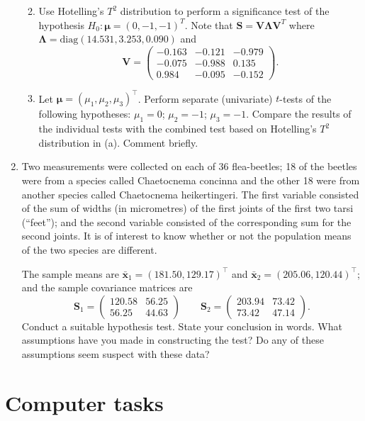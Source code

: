 \documentclass[]{book}
\providecommand{\tightlist}{%
  \setlength{\itemsep}{0pt}\setlength{\parskip}{0pt}}
\theoremstyle{definition}
\theoremstyle{definition}
\theoremstyle{definition}
\theoremstyle{remark}
\begin{document}
\begin{enumerate}
  \begin{enumerate}
  \def\labelenumii{\roman{enumii}.}
  \tightlist
  \item
    Use Hotelling's \(T^2\) distribution to perform a significance test of the hypothesis \(H_0: {\boldsymbol{\mu}}= (0,-1,-1)^T\). Note that \(\mathbf S= \mathbf V\boldsymbol \Lambda\mathbf V^T\) where \(\boldsymbol \Lambda= \text{diag}(14.531, 3.253,0.090)\) and
    \[\mathbf V= \begin{pmatrix} -0.163 & -0.121 & -0.979 \\ -0.075 & -0.988 & 0.135 \\ 0.984 & -0.095 & -0.152 \end{pmatrix}.\]
  \item
    Let \({\boldsymbol{\mu}}= (\mu_1,\mu_2,\mu_3)^\top\). Perform separate (univariate) \(t\)-tests of the following hypotheses: \(\mu_1 = 0\); \(\mu_2 = -1\); \(\mu_3 = -1\). Compare the results of the individual tests with the combined test based on Hotelling's \(T^2\) distribution in (a). Comment briefly.
  \end{enumerate}
\item
  Two measurements were collected on each of 36 flea-beetles; 18 of the beetles were from a species called Chaetocnema concinna and the other 18 were from another species called Chaetocnema heikertingeri. The first variable consisted of the sum of widths (in micrometres) of the first joints of the first two tarsi (``feet''); and the second variable consisted of the corresponding sum for the second joints. It is of interest to know
  whether or not the population means of the two species are different.

  The sample means are \(\bar{\mathbf x}_1 = (181.50,129.17)^\top\) and \(\bar{\mathbf x}_2 = (205.06,120.44)^\top\); and the sample covariance matrices are
  \[\mathbf S_1 = \begin{pmatrix} 120.58 & 56.25 \\ 56.25 & 44.63 \end{pmatrix} \qquad
  \mathbf S_2 = \begin{pmatrix} 203.94 & 73.42 \\ 73.42 & 47.14 \end{pmatrix}.\]
  Conduct a suitable hypothesis test. State your conclusion in words. What assumptions have you made in constructing the test? Do any of these assumptions seem suspect with these data?
\end{enumerate}

\hypertarget{computer-tasks-3}{%
\section{Computer tasks}\label{computer-tasks-3}}
\end{document}
